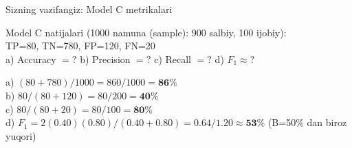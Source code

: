 \documentclass[aspectratio=169,11pt]{beamer}
\begin{document}
\begin{frame}{Sizning vazifangiz: Model C metrikalari}
  \begin{tcolorbox}[warnbox,title=Vazifa (4 daqiqa)]
    \small
    Model C natijalari (1000 namuna (sample): 900 salbiy, 100 ijobiy):\\[4pt]
    TP=80,\; TN=780,\; FP=120,\; FN=20\\[4pt]
    a)\; Accuracy $= ?$\quad
    b)\; Precision $= ?$\quad
    c)\; Recall $= ?$\quad
    d)\; $F_1 \approx ?$
  \end{tcolorbox}
  \pause
  \begin{tcolorbox}[okbox,title=Javob]
    \small
    a)\; $(80+780)/1000=860/1000=\mathbf{86\%}$\\[4pt]
    b)\; $80/(80+120)=80/200=\mathbf{40\%}$\\[4pt]
    c)\; $80/(80+20)=80/100=\mathbf{80\%}$\\[4pt]
    d)\; $F_1=2(0.40)(0.80)/(0.40+0.80)
         =0.64/1.20\approx\mathbf{53\%}$\quad
    \textcolor{halfgray}{\footnotesize (B=50\% dan biroz yuqori)}
  \end{tcolorbox}
\end{frame}
\end{document}

